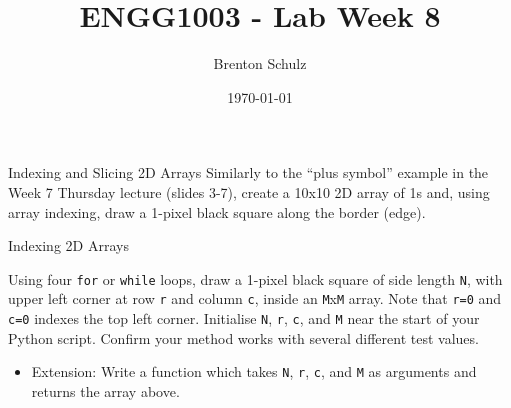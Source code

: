 \documentclass{lab}
\title{ENGG1003 - Lab Week 8}
\author{Brenton Schulz}
\date{\today}
\begin{document}
\maketitle

\begin{task}{Indexing and Slicing 2D Arrays}{}
Similarly to the ``plus symbol'' example in the Week 7 Thursday lecture (slides 3-7), create a 10x10 2D array of 1s and, using array indexing, draw a 1-pixel black square along the border (edge).
\end{task}

\begin{task}{Indexing 2D Arrays}{}

Using four \texttt{for} or \texttt{while} loops, draw a 1-pixel black square of side length \texttt{N}, with upper left corner at row \texttt{r} and column \texttt{c}, inside an \texttt{M}x\texttt{M} array. Note that \texttt{r=0} and \texttt{c=0} indexes the top left corner. Initialise \texttt{N}, \texttt{r}, \texttt{c}, and \texttt{M} near the start of your Python script. Confirm your method works with several different test values. 
	\begin{itemize}
		\item Extension: Write a function which takes \texttt{N}, \texttt{r}, \texttt{c}, and \texttt{M} as arguments and returns the array above.
	\end{itemize}

\end{task}
\end{document}
